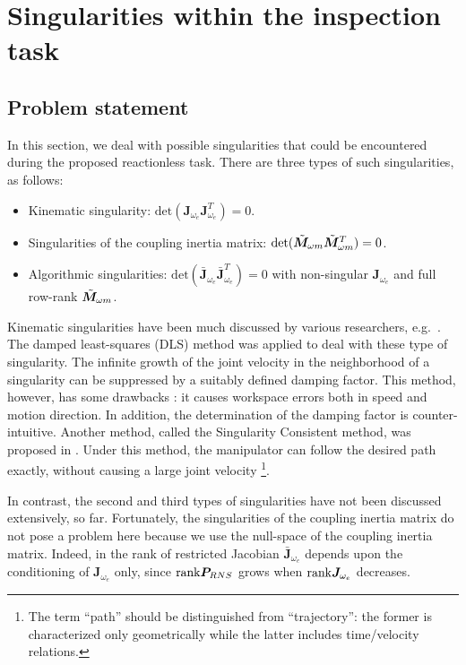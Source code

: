 \section{Singularities within the inspection task}
\label{sec:SINGULAR}
\subsection{Problem statement}
\label{sec:PROBLEM}
In this section, we deal with possible singularities that could be encountered during 
the proposed reactionless task. There are three types of such singularities, as follows:
\begin{itemize}
\item Kinematic singularity: $\mathrm{det}(\bm{J}_{\omega_{e}}\bm{J}_{\omega_{e}}^{T}) = 0$.
\item Singularities of the coupling inertia matrix: $\mathrm{det}({\tilde{\bm{M}}}_{\omega m}{\tilde{\bm{M}}}_{\omega m}^{T}) = 0$.
\item Algorithmic singularities: $\mathrm{det}(\bar{\bm{J}}_{\omega_{e}}\bar{\bm{J}}_{\omega_{e}}^{T}) = 0$
with non-singular $\bm{J}_{\omega_{e}}$ and full row-rank ${\tilde{\bm{M}}}_{\omega m}$.
\end{itemize}
%
Kinematic singularities have been much discussed by various researchers, 
e.g.\ \cite{Kreutz-Delgado1992, Boudreau2010}. The damped least-squares  (DLS) method
was applied \cite{Nakamura1986,Wampler1986} to deal with these type of singularity.  
The infinite growth  of the joint velocity in the neighborhood of a singularity can be suppressed 
by a suitably defined  damping factor. This method, however, has some drawbacks \cite{Nenchev1996}: it causes 
workspace errors both in speed and motion direction. In addition, the determination of the damping factor is 
counter-intuitive. Another method,  called the Singularity Consistent method, was proposed in \cite{Nenchev2000}.
Under this method, the manipulator can follow the desired path exactly, without causing a large joint velocity%
\footnote{The term ``path'' should be distinguished from ``trajectory'':
the former is characterized only geometrically while the latter includes  time/velocity 
relations.}.

In contrast, the second and third types of singularities  have not been discussed extensively, so far.
Fortunately, the singularities of the coupling inertia matrix do not pose a problem here
because we use the null-space of the coupling inertia matrix.
Indeed, in  the rank of restricted Jacobian $\bar{\bm{J}}_{\omega_{e}}$ depends upon the conditioning 
of $\bm{J}_{\omega_{e}}$ only, since ${\rm rank}\bm{P}_{RNS}$ grows when ${\rm rank} \bm{J}_{\omega_{e}}$
decreases. %

